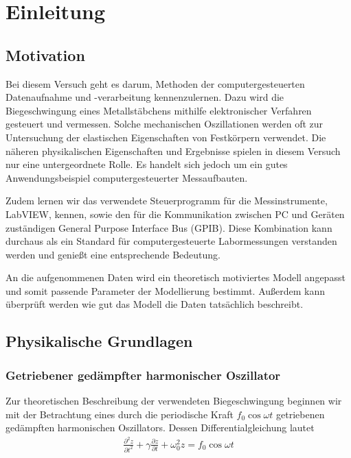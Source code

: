 \section{Einleitung}

\subsection{Motivation}

Bei diesem Versuch geht es darum, Methoden der computergesteuerten Datenaufnahme und -verarbeitung kennenzulernen.
Dazu wird die Biegeschwingung eines Metallstäbchens mithilfe elektronischer Verfahren gesteuert und vermessen.
Solche mechanischen Oszillationen werden oft zur Untersuchung der elastischen Eigenschaften von Festkörpern verwendet.
Die näheren physikalischen Eigenschaften und Ergebnisse spielen in diesem Versuch nur eine untergeordnete Rolle.
Es handelt sich jedoch um ein gutes Anwendungsbeispiel computergesteuerter Messaufbauten.

Zudem lernen wir das verwendete Steuerprogramm für die Messinstrumente, LabVIEW, kennen, sowie den für die Kommunikation zwischen PC und Geräten zuständigen General Purpose Interface Bus (GPIB).
Diese Kombination kann durchaus als ein Standard für computergesteuerte Labormessungen verstanden werden und genießt eine entsprechende Bedeutung.

An die aufgenommenen Daten wird ein theoretisch motiviertes Modell angepasst und somit passende Parameter der Modellierung bestimmt.
Außerdem kann überprüft werden wie gut das Modell die Daten tatsächlich beschreibt.

\subsection{Physikalische Grundlagen}

\subsubsection*{Getriebener gedämpfter harmonischer Oszillator}

Zur theoretischen Beschreibung der verwendeten Biegeschwingung beginnen wir mit der Betrachtung eines durch die periodische Kraft $f_0 \cos \omega t$ getriebenen gedämpften harmonischen Oszillators.
Dessen Differentialgleichung lautet
\begin{align}
\frac{\partial^2 z}{\partial t^2} + \gamma \frac{\partial z}{\partial t} + \omega_0^2 z = f_0 \cos \omega t
\end{align}

